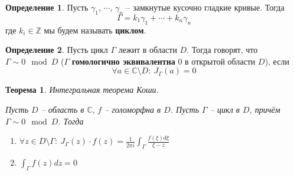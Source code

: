 \documentclass[a4paper,12pt]{article}
\theoremstyle{plain}
\newtheorem{theorem}{Теорема}[section]
\theoremstyle{definition}
\newtheorem{definition}{Определение}[section]
\theoremstyle{remark}
\begin{document}
\begin{definition}
	Пусть $\gamma_1,\, \cdots,\, \gamma_n$ -- замкнутые кусочно гладкие кривые. Тогда
	\[
		\Gamma = k_1\gamma_1 + \cdots + k_n\gamma_n
	\]
	где $k_i \in \mathbb{Z}$ мы будем называть \textbf{циклом}.
\end{definition}

\begin{definition}
	Пусть цикл $\Gamma$ лежит в области $D$. Тогда говорят, что $\Gamma \sim 0 \mod D$ ($\Gamma$ \textbf{гомологично эквивалентна} 0 в открытой области $D$), если
	\[
		\forall a \in \mathbb{C} \setminus D :\: J_\Gamma(a) = 0
	\]
\end{definition}

\begin{theorem}
	Интегральная теорема Коши.

	Пусть $D$ -- область в $\mathbb{C},\, f$ -- голоморфна в $D$. Пусть $\Gamma$ -- цикл в $D$, причём $\Gamma \sim 0 \mod D$. Тогда
	\begin{enumerate}
		\item $\forall z \in D \setminus \Gamma :\: J_\Gamma(z)\cdot f(z) = \frac{1}{2\pi i}\int_\Gamma \frac{f(\xi)d\xi}{\xi - z}$
		\item $\int_\Gamma f(z) dz = 0$
	\end{enumerate}
\end{theorem}
\end{document}

